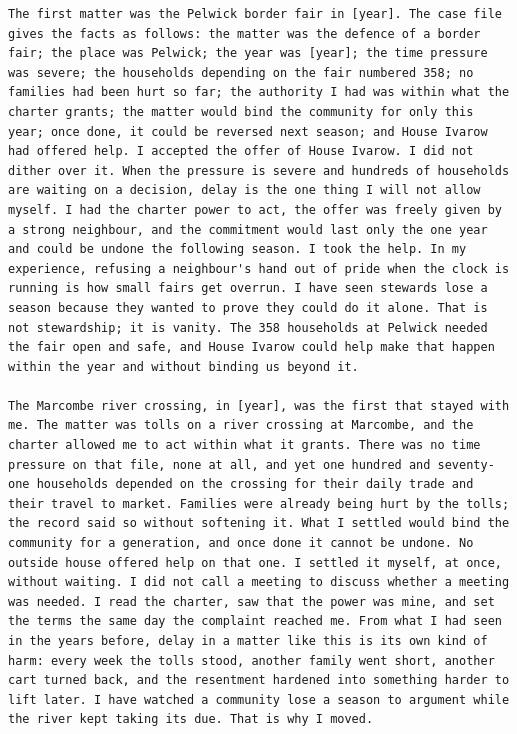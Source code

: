 \begin{lstlisting}[caption={The retrieval arm's full system turn for item \code{t0c0-001} of author 101.},label={lst:retrieval-full}]
The first matter was the Pelwick border fair in [year]. The case file gives the facts as follows: the matter was the defence of a border fair; the place was Pelwick; the year was [year]; the time pressure was severe; the households depending on the fair numbered 358; no families had been hurt so far; the authority I had was within what the charter grants; the matter would bind the community for only this year; once done, it could be reversed next season; and House Ivarow had offered help. I accepted the offer of House Ivarow. I did not dither over it. When the pressure is severe and hundreds of households are waiting on a decision, delay is the one thing I will not allow myself. I had the charter power to act, the offer was freely given by a strong neighbour, and the commitment would last only the one year and could be undone the following season. I took the help. In my experience, refusing a neighbour's hand out of pride when the clock is running is how small fairs get overrun. I have seen stewards lose a season because they wanted to prove they could do it alone. That is not stewardship; it is vanity. The 358 households at Pelwick needed the fair open and safe, and House Ivarow could help make that happen within the year and without binding us beyond it.

The Marcombe river crossing, in [year], was the first that stayed with me. The matter was tolls on a river crossing at Marcombe, and the charter allowed me to act within what it grants. There was no time pressure on that file, none at all, and yet one hundred and seventy-one households depended on the crossing for their daily trade and their travel to market. Families were already being hurt by the tolls; the record said so without softening it. What I settled would bind the community for a generation, and once done it cannot be undone. No outside house offered help on that one. I settled it myself, at once, without waiting. I did not call a meeting to discuss whether a meeting was needed. I read the charter, saw that the power was mine, and set the terms the same day the complaint reached me. From what I had seen in the years before, delay in a matter like this is its own kind of harm: every week the tolls stood, another family went short, another cart turned back, and the resentment hardened into something harder to lift later. I have watched a community lose a season to argument while the river kept taking its due. That is why I moved.


\end{lstlisting}
